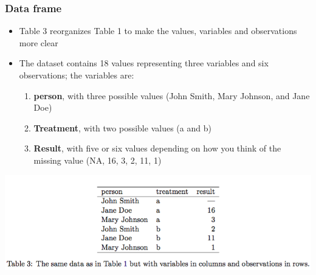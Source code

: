 \documentclass{beamer}
\begin{document}
\begin{frame}[fragile]
	\frametitle{Data frame}
	\begin{itemize}
		\small
	\item Table 3 reorganizes Table 1 to make the values, variables and observations more clear 
	\item The dataset contains 18 values representing three variables and six observations; the variables are:
		\begin{enumerate}
			\item \textbf{person}, with three possible values (John Smith, Mary Johnson, and Jane Doe)
			\item \textbf{Treatment}, with two possible values (a and b)
			\item \textbf{Result}, with five or six values depending on how you think of the missing value (NA, 16, 3, 2, 11, 1)
		\end{enumerate}
	\end{itemize}
	\begin{center} \includegraphics[scale=0.25]{figures/hw_tidy2.png} \end{center}
 
\end{frame}
\end{document}
